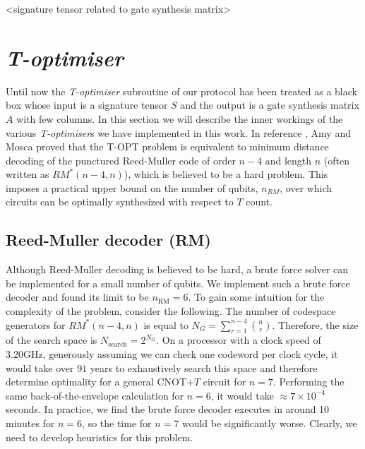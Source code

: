 \documentclass[notitlepage]{article}
\theoremstyle{definition}
\theoremstyle{problem}
\theoremstyle{lemma}
\begin{document}
<signature tensor related to gate synthesis matrix> \fi

\section{\emph{T-optimiser}}
\label{s_topt}
Until now the \emph{T-optimiser} subroutine of our protocol has been treated as a black box whose input is a signature tensor $S$ and the output is a gate synthesis matrix $A$ with few columns. In this section we will describe the inner workings of the various \emph{T-optimiser}s we have implemented in this work. In reference \cite{3_Amy_2016}, Amy and Mosca proved that the T-OPT problem is equivalent to minimum distance decoding of the punctured Reed-Muller code of order $n-4$ and length $n$ (often written as $RM^*(n-4, n)$), which is believed to be a hard problem. This imposes a practical upper bound on the number of qubits, $n_{RM}$, over which circuits can be optimally synthesized with respect to $T$ count.

\subsection{Reed-Muller decoder (RM)}
Although Reed-Muller decoding is believed to be hard, a brute force solver can be implemented for a small number of qubits. We implement such a brute force decoder and found its limit to be $n_{\text{RM}}=6$.
To gain some intuition for the complexity of the problem, consider the following. The number of codespace generators for $RM^*(n-4, n)$ is equal to $N_G = \sum_{r=1}^{n-4}{{n}\choose{r}}$.
Therefore, the size of the search space is $N_{\text{search}} = 2^{N_G}$. On a processor with a clock speed of 3.20GHz, generously assuming we can check one codeword per clock cycle, it would take over $91$ years to exhaustively search this space and therefore determine optimality for a general CNOT+$T$ circuit for $n=7$. Performing the same back-of-the-envelope calculation for $n=6$, it would take $\approx 7\times 10^{-4}$ seconds. In practice, we find the brute force decoder executes in around 10 minutes for $n=6$, so the time for $n=7$ would be significantly worse. Clearly, we need to develop heuristics for this problem.
\end{document}
